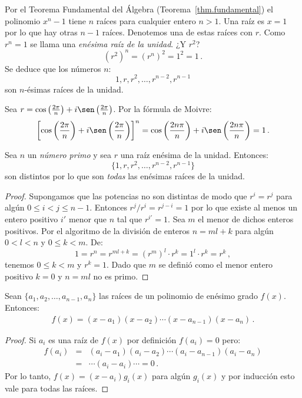 Por el Teorema Fundamental del Álgebra (Teorema~\ref{thm.fundamental}) el polinomio $x^{n}-1$ tiene $n$ raíces para cualquier entero $n> 1$. Una raíz es $x=1$ por lo que hay otras $n-1$ raíces. Denotemos una de estas raíces con $r$. Como $r^{n}=1$ se llama una \emph{enésima raíz de la unidad}. ¿Y $r^2$?
\[
(r^{2})^n=(r^{n})^2=1^2=1\,.
\]
Se deduce que los números $n$:
\[
1, r, r^2, \ldots, r^{n-2}, r^{n-1}
\]
son $n$-ésimas raíces de la unidad.

\begin{advanced}
Sea $r=\cos \left(\frac{2\pi}{n}\right) + i\sen  \left(\frac{2\pi}{n}\right)$.
Por la fórmula de Moivre:
\[
\left[\cos \left(\frac{2\pi}{n}\right) + i\sen  \left(\frac{2\pi}{n}\right)\right]^{n}=
\cos \left(\frac{2 n\pi}{n}\right) + i\sen  \left(\frac{2 n\pi}{n}\right)= 1\,.
\]
\vspace*{-3ex}
\end{advanced}

\begin{theorem}
Sea $n$ un \emph{número primo} y sea $r$ una raíz enésima de la unidad. Entonces:
\[
\{1,r,r^2,\ldots,r^{n-2},r^{n-1}\}
\]
son distintos por lo que son \emph{todas} las enésimas raíces de la unidad.
\end{theorem}

\begin{proof}
Supongamos que las potencias no son distintas de modo que $r^i=r^j$ para algún $0\leq i<j\leq n-1$. Entonces $r^j/r^i=r^{j-i}=1$ por lo que existe al menos un entero positivo $i'$ menor que $n$ tal que $r^{i'}=1$. Sea $m$ el menor de dichos enteros positivos. Por el algoritmo de la división de enteros $n=ml+k$ para algún $0<l<n$ y $0\leq k<m$. De:
\[
1=r^n=r^{ml+k}=(r^m)^l\cdot r^k=1^l\cdot r^k=r^k\,,
\]
tenemos $0\leq k<m$ y $r^k=1$. Dado que $m$ se definió como el menor entero positivo $k=0$ y $n=ml$ no es primo.
\end{proof}

\begin{theorem} Sean $\{a_1,a_2,\ldots,a_{n-1},a_n\}$ las raíces de un polinomio de enésimo grado $f(x)$. Entonces:
\begin{align}\label{eq.viete}
f(x) =(x-a_1) (x-a_2)\cdots (x-a_{n-1})(x-a_n)\,.
\end{align}
\end{theorem}

\begin{proof}
Si $a_i$ es una raíz de $f(x)$ por definición $f(a_i)=0$ pero:
\begin{eqnarray*}
f(a_i)&=&(a_i-a_1) (a_i-a_2)\cdots (a_i-a_{n-1})(a_i-a_n)\\
&=&\cdots (a_i-a_i) \cdots =0\,.
\end{eqnarray*}
Por lo tanto, $f(x)=(x-a_i)g_i(x)$ para algún $g_i(x)$ y por inducción esto vale para todas las raíces.
\end{proof}

